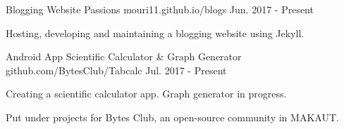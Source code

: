 


\begin{cventries}


\cventry
{Blogging Website} %
{Passions} %
{mouri11.github.io/blogs} %
{Jun. 2017 - Present} %
{ %
\begin{cvitems}
\item {Hosting, developing and maintaining a blogging website using Jekyll.}
\end{cvitems}
}


\cventry
{Android App} %
{Scientific Calculator \& Graph Generator} %
{github.com/BytesClub/Tabcalc} %
{Jul. 2017 - Present} %
{ %
\begin{cvitems}
\item {Creating a scientific calculator app. Graph generator in progress.}
\item {Put under projects for Bytes Club, an open-source community in MAKAUT.}
\end{cvitems}
}


\end{cventries}
